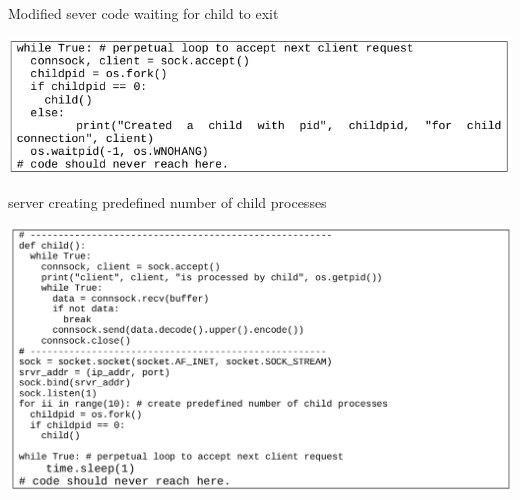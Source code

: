 \begin{table}[H]
\centering
\caption{Modified sever code waiting for child to exit}\label{fig11}
\includegraphics[scale=2.92]{src/Figures/chap1/fig11.jpg}
\end{table}

\begin{table}[H]
\centering
\caption{server creating predefined number of child processes}\label{fig12}
\includegraphics[scale=2]{src/Figures/chap1/fig12.jpg}
\end{table}

